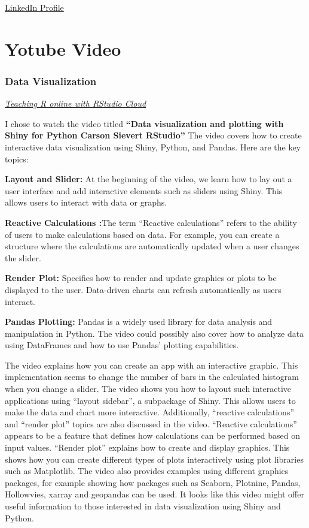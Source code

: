 \documentclass[
  letterpaper,
  DIV=11,
  numbers=noendperiod]{scrreprt}
\begin{document}
\href{https://www.linkedin.com/in/özgenurşensoy/}{LinkedIn Profile}


\hypertarget{yotube-video}{%
\chapter{\textbar{} Yotube Video}\label{yotube-video}}

\hypertarget{data-visualization}{%
\subsection{Data Visualization}\label{data-visualization}}

\href{https://www.youtube.com/watch?v=5zJC0AB-UK8\&list=PL9HYL-VRX0oTOK4cpbCbRk15K2roEgzVW\&index=21}{\emph{Teaching
R online with RStudio Cloud}}

I chose to watch the video titled \textbf{``Data visualization and
plotting with Shiny for Python \textbar\textbar{} Carson Sievert
\textbar\textbar{} RStudio''} The video covers how to create interactive
data visualization using Shiny, Python, and Pandas. Here are the key
topics:

\textbf{Layout and Slider:} At the beginning of the video, we learn how
to lay out a user interface and add interactive elements such as sliders
using Shiny. This allows users to interact with data or graphs.

\textbf{Reactive Calculations :}The term ``Reactive calculations''
refers to the ability of users to make calculations based on data. For
example, you can create a structure where the calculations are
automatically updated when a user changes the slider.

\textbf{Render Plot:} Specifies how to render and update graphics or
plots to be displayed to the user. Data-driven charts can refresh
automatically as users interact.

\textbf{Pandas Plotting:} Pandas is a widely used library for data
analysis and manipulation in Python. The video could possibly also cover
how to analyze data using DataFrames and how to use Pandas' plotting
capabilities.

The video explains how you can create an app with an interactive
graphic. This implementation seems to change the number of bars in the
calculated histogram when you change a slider. The video shows you how
to layout such interactive applications using ``layout sidebar'', a
subpackage of Shiny. This allows users to make the data and chart more
interactive. Additionally, ``reactive calculations'' and ``render plot''
topics are also discussed in the video. ``Reactive calculations''
appears to be a feature that defines how calculations can be performed
based on input values. ``Render plot'' explains how to create and
display graphics. This shows how you can create different types of plots
interactively using plot libraries such as Matplotlib. The video also
provides examples using different graphics packages, for example showing
how packages such as Seaborn, Plotnine, Pandas, Hollowvies, xarray and
geopandas can be used. It looks like this video might offer useful
information to those interested in data visualization using Shiny and
Python.
\end{document}
